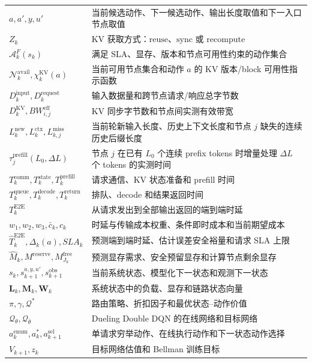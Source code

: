 \begin{longtable}{p{}p{}}
\(a,a',y,u'\) & 当前候选动作、下一候选动作、输出长度取值和下一入口节点取值 \\
\(Z_k\) & KV 获取方式：\(\mathrm{reuse}\)、\(\mathrm{sync}\) 或 \(\mathrm{recompute}\) \\
\(\mathcal A_k^F(s_k)\) & 满足 SLA、显存、版本和节点可用性约束的动作集合 \\
\(\mathcal N_k^{\mathrm{avail}},\chi_k^{\mathrm{KV}}(a)\) & 当前可用节点集合和动作 \(a\) 的 KV 版本/block 可用性指示函数 \\
\(D_k^{\mathrm{input}},D_k^{\mathrm{request}}\) & 输入数据量和跨节点请求/响应总字节数 \\
\(D_k^{\mathrm{KV}},BW_{i,j}^{\mathrm{eff}}\) & KV 同步字节数和节点间实测有效带宽 \\
\(L_k^{\mathrm{new}},L_k^{\mathrm{ctx}},L_{k,j}^{\mathrm{miss}}\) & 当前轮新输入长度、历史上下文长度和节点 \(j\) 缺失的连续历史后缀长度 \\
\(\tau_j^{\mathrm{prefill}}(L_0,\Delta L)\) & 节点 \(j\) 在已有 \(L_0\) 个连续 prefix tokens 时增量处理 \(\Delta L\) 个 tokens 的实测时间 \\
\(T_k^{\mathrm{comm}},T_k^{\mathrm{state}},T_k^{\mathrm{prefill}}\) & 请求通信、KV 状态准备和 prefill 时间 \\
\(T_k^{\mathrm{queue}},T_k^{\mathrm{decode}},T_k^{\mathrm{return}}\) & 排队、decode 和结果返回时间 \\
\(T_k^{\mathrm{E2E}}\) & 从请求发出到全部输出返回的端到端时延 \\
\(w_1,w_2,w_3,\bar c_k,c_k\) & 时延与传输成本权重、条件即时成本和当前期望成本 \\
\(\widehat T_k^{\mathrm{E2E}},\Delta_k(a),SLA_k\) & 预测端到端时延、估计误差安全裕量和请求 SLA 上限 \\
\(\widehat M_k,M^{\mathrm{reserve}},M_{J_k}^{\mathrm{free}}\) & 预测显存需求、安全预留显存和计算节点剩余显存 \\
\(s_k,s_{k+1}^{a,y,u'},s_{k+1}^{\mathrm{obs}}\) & 当前系统状态、模型化下一状态和观测下一状态 \\
\(\mathbf L_k,\mathbf M_k,\mathbf W_k\) & 系统状态中的负载、显存和链路状态向量 \\
\(\pi,\gamma,\mathcal Q^*\) & 路由策略、折扣因子和最优状态--动作价值 \\
\(\mathcal Q_\theta,\mathcal Q_{\bar\theta}\) & Dueling Double DQN 的在线网络和目标网络 \\
\(a_k^{\mathrm{enum}},a_k^*,a_{k+1}^{\mathrm{sel}}\) & 单请求穷举动作、在线执行动作和下一状态动作选择 \\
\(V_{k+1},z_k\) & 目标网络估值和 Bellman 训练目标 \\
\bottomrule
\end{longtable}
\endgroup

